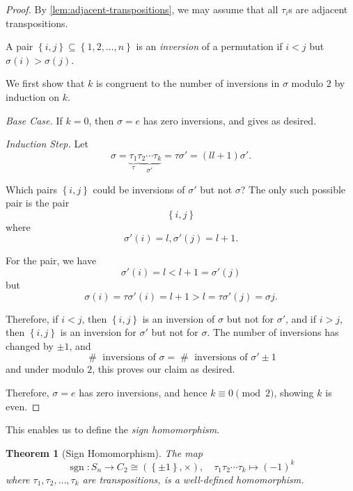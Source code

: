 \documentclass{article}
\newtheorem{theorem}{Theorem}[section]
\theoremstyle{definition}
\theoremstyle{remark}
\newcommand{\pqty}[1]{\left(#1\right)}
\newcommand{\Bqty}[1]{\left\{#1\right\}}
\newcommand{\function}[5]{#1:#2\to #3,\quad #4\mapsto #5}
\newcommand{\perm}[1]{(#1)}
\newcommand{\isomorphic}{\cong}
\newcommand{\sign}{\operatorname{sgn}}
\newcommand{\size}{\mathop{\#}}
\begin{document}
\begin{proof}
    By \autoref{lem:adjacent-transpositions}, we may assume that all \(\tau_{i}\)s are adjacent transpositions.

    A pair \(\Bqty{i, j} \subseteq \Bqty{1, 2, \ldots, n}\) is an \emph{inversion} of a permutation if \(i < j\) but \(\sigma\pqty{i} > \sigma\pqty{j}\).
    
    We first show that \(k\) is congruent to the number of inversions in \(\sigma\) modulo \(2\) by induction on \(k\).

    \emph{Base Case.} If \(k = 0\), then \(\sigma = e\) has zero inversions, and gives as desired.

    \emph{Induction Step.} Let
    \[
        \sigma = \underbrace{\tau_1}_{\tau} \underbrace{\tau_2 \cdots \tau_k}_{\sigma'} = \tau \sigma' = \perm{l {l + 1}} \sigma'.
    \]

    Which pairs \(\Bqty{i, j}\) could be inversions of \(\sigma'\) but not \(\sigma\)? The only such possible pair is the pair
    \[
        \Bqty{i, j}
    \]
    where
    \[
        \sigma'\pqty{i} = l, \sigma'\pqty{j} = l + 1.
    \]

    For the pair, we have
    \[
        \sigma'\pqty{i} = l < l + 1 = \sigma'\pqty{j}
    \]
    but
    \[
        \sigma\pqty{i} = \tau\sigma'\pqty{i} = l + 1 > l = \tau\sigma'\pqty{j} = \sigma{j}.
    \]

    Therefore, if \(i < j\), then \(\Bqty{i, j}\) is an inversion of \(\sigma\) but not for \(\sigma'\), and if \(i > j\), then \(\Bqty{i, j}\) is an inversion for \(\sigma'\) but not for \(\sigma\). The number of inversions has changed by \(\pm 1\), and
    \[
        \size \text{ inversions of }\sigma = \size \text{ inversions of } \sigma' \pm 1
    \]
    and under modulo \(2\), this proves our claim as desired.

    Therefore, \(\sigma = e\) has zero inversions, and hence \(k \equiv 0 \pmod{2}\), showing \(k\) is even.
\end{proof}

This enables us to define the \emph{sign homomorphism}.

\begin{theorem}[Sign Homomorphism]
    \label{thm:sign-homomorphism}%
    The map
    \[
        \function{\sign}{S_n}{C_2 \isomorphic \pqty{\Bqty{\pm 1}, \times}}{\tau_1 \tau_2 \cdots \tau_k}{\pqty{-1}^k}
    \]
    where \(\tau_1, \tau_2, \ldots, \tau_k\) are transpositions, is a well-defined homomorphism.
\end{theorem}
\end{document}
